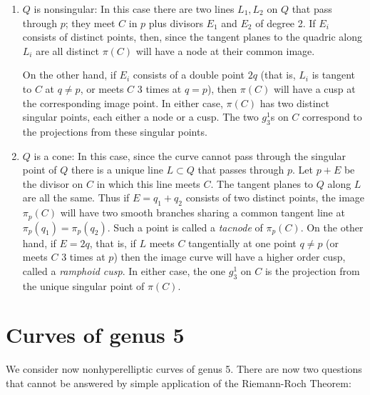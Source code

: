 \begin{enumerate}
\item $Q$ is nonsingular:
In this case there are two lines $L_1, L_2$ on $Q$ that pass through $p$; they meet $C$ in $p$ plus divisors $E_1$ and $E_2$ of degree 2. If $E_i$ consists of distinct points, then, since the tangent planes to the quadric along $L_i$ are all distinct $\pi(C)$ will have a node at their common image. 


On the other hand, if $E_i$ consists of a double point $2q$ (that is, $L_i$ is tangent to $C$ at $q\neq p$, or meets $C$ 3 times at $q = p$), then $\pi(C)$ will have a cusp at the corresponding image point. 
In either case, $\pi(C)$ has two distinct singular points, each either a node or a cusp. The two $g^1_3$s on $C$ correspond to the projections from these singular points.

\item $Q$ is a cone:
In this case, since the curve cannot pass through the singular point of $Q$ there is a unique line $L\subset Q$ that passes through $p$. Let $p+E$ be the divisor on $C$ in which this line meets $C$. The tangent planes to $Q$ along $L$ are all the same. Thus if $E = q_1+q_2$ consists of two distinct points, the image $\pi_p(C)$ will have two smooth branches sharing a common tangent line at
$\pi_p(q_1) = \pi_p(q_2)$. Such a point is called a \emph{tacnode} of $\pi_p(C)$. On the other hand, if $E= 2q$, that is, if $L$ meets $C$ tangentially at one point $q\neq p$ (or meets $C$ 3 times at $p$) then the image curve will have a higher order cusp, called a \emph{ramphoid cusp}. In either case, the one $g^1_3$ on $C$ is the projection from the unique singular point of $\pi(C)$.
\end{enumerate}



\section{Curves of genus 5}

We consider now nonhyperelliptic curves of genus 5. There are now two questions that cannot be answered by simple application of the Riemann-Roch Theorem:

